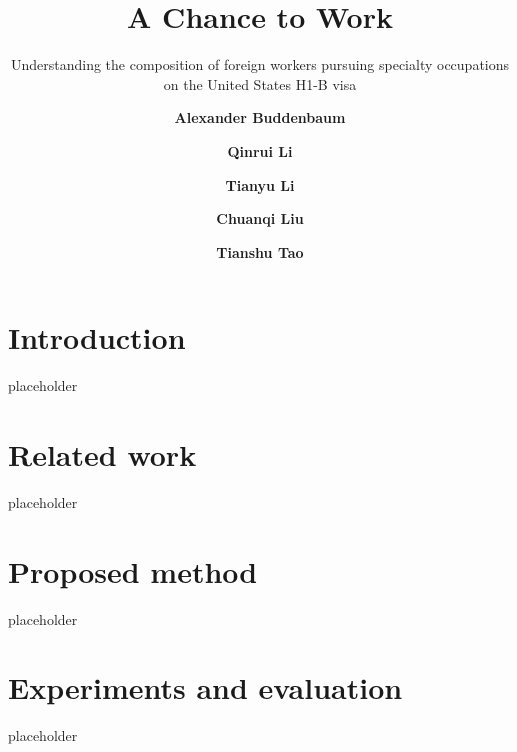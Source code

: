 \documentclass[sigconf]{acmart}
\begin{document}
\title{A Chance to Work}
\subtitle{Understanding the composition of foreign workers 
pursuing specialty occupations on the United States H1-B visa
}


\author{\textbf{Alexander Buddenbaum}}

\author{\textbf{Qinrui Li}}

\author{\textbf{Tianyu Li}}


\author{\textbf{Chuanqi Liu}}

\author{\textbf{Tianshu Tao}}



\maketitle

\section{Introduction}

placeholder

\section{Related work}

placeholder

\section{Proposed method}
placeholder

\section{Experiments and evaluation}
placeholder
\end{document}
